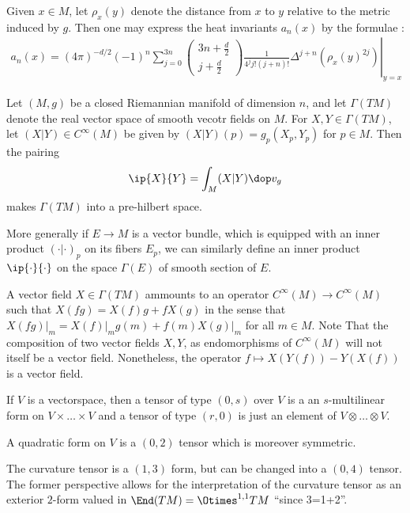 Given $x\in M$, let $\rho_x(y)$ denote the distance from $x$ to $y$ relative to the metric induced by $g$.  Then one may express the heat invariants $a_n(x)$ by the formulae \cite[Theorem 1.2.1]{polterovichHeatInvariantsRiemannian2000}:
\begin{align}
    a_n(x) = \left.(4 \pi)^{-d / 2}(-1)^n \sum_{j=0}^{3 n}\left(\begin{array}{c}
                                                                        3 n+\frac{d}{2} \\
                                                                        j+\frac{d}{2}
                                                                    \end{array}\right) \frac{1}{4^j j !(j+n) !} \Delta^{j+n}\left(\rho_x(y)^{2 j}\right)\right|_{y=x}
\end{align}


\newpage

Let $(M,g)$ be a closed Riemannian manifold of dimension $n$, and let $\Gamma(TM)$ denote the real vector space of smooth vecotr fields on $M$. For $X,Y \in \Gamma(TM)$, let $(X|Y) \in C^\infty(M)$ be given by $(X|Y)(p) = g_p(X_p,Y_p)$ for $p \in M$. Then the pairing
\begin{align*}
    \ip{X}{Y} = \int_M (X|Y) \dop v_g
\end{align*}
makes $\Gamma(TM)$ into a pre-hilbert space.

More generally if $E \to M$ is a vector bundle, which is equipped with an inner product $(\cdot | \cdot)_p$ on its fibers $E_p$, we can similarly define an inner product $\ip{\cdot}{\cdot}$ on the space $\Gamma(E)$ of smooth section of $E$.

\newpage
A vector field $X \in \Gamma(TM)$ ammounts to an operator $C^\infty(M) \to C^\infty(M)$ such that $X(fg)= X(f)g+fX(g)$ in the sense that $X(fg)\vert_m = X(f)\vert_m g(m) + f(m) X(g)\vert_m$ for all $m \in M$. Note That the composition of two vector fields $X,Y$, as endomorphisms of $C^\infty(M)$ will not itself be a vector field. Nonetheless, the operator $f \mapsto X(Y(f)) - Y(X(f))$ is a vector field.

If $V$ is a vectorspace, then a tensor of type $(0,s)$ over $V$ is a an $s$-multilinear form on $V\times\dots \times V$ and a tensor of type $(r,0)$ is just an element of $V \otimes \dots \otimes V$.

A quadratic form on $V$ is a $(0,2)$ tensor which is moreover symmetric.

The curvature tensor is a $(1,3)$ form, but can be changed into a $(0,4)$ tensor. The former perspective allows for the interpretation of the curvature tensor as an exterior $2$-form valued in $\End(TM) = \Otimes^{1,1} TM$ ``since 3=1+2''.

